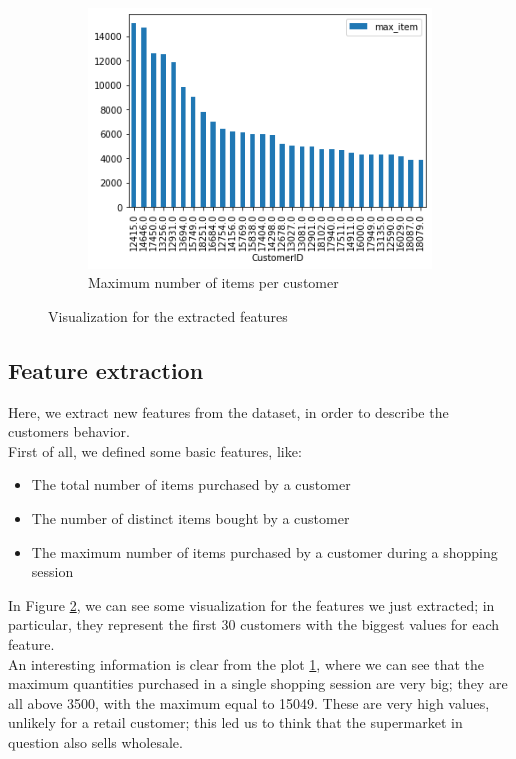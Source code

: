 \begin{figure}[h!]
\begin{subfigure}{.3\textwidth}
\centering
\includegraphics[width=\textwidth]{img/max_item.png}
\caption{Maximum number of items per customer}
\label{fig:max_item}
\end{subfigure}
\caption{Visualization for the extracted features}
\label{fig:first_features}
\end{figure}

\subsection{Feature extraction}
Here, we extract new features from the dataset, in order to describe the customers behavior.\\
First of all, we defined some basic features, like:
\begin{itemize}
\item The total number of items purchased by a customer
\item The number of distinct items bought by a customer
\item The maximum number of items purchased by a customer during a shopping session
\end{itemize}

In Figure \ref{fig:first_features}, we can see some visualization for the features we just extracted; in particular, they represent the first 30 customers with the biggest values for each feature.\\
An interesting information is clear from the plot \ref{fig:max_item}, where we can see that the maximum quantities purchased in a single shopping session are very big; they are all above 3500, with the maximum equal to 15049. These are very high values, unlikely for a retail customer; this led us to think that the supermarket in question also sells wholesale.


